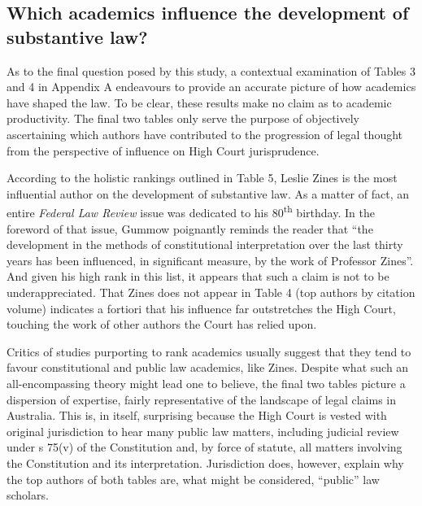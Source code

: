 \subsection{Which academics influence the development of substantive law?}

As to the final question posed by this study, a contextual examination of Tables 3 and 4 in Appendix A endeavours to provide an accurate picture of how academics have shaped the law. To be clear, these results make no claim as to academic productivity. The final two tables only serve the purpose of objectively ascertaining which authors have contributed to the progression of legal thought from the perspective of influence on High Court jurisprudence.

According to the holistic rankings outlined in Table 5, Leslie Zines is the most influential author on the development of substantive law. As a matter of fact, an entire \textit{Federal Law Review} issue was dedicated to his 80\textsuperscript{th} birthday. In the foreword of that issue, Gummow poignantly reminds the reader that ``the development in the methods of constitutional interpretation over the last thirty years has been influenced, in significant measure, by the work of Professor Zines''. And given his high rank in this list, it appears that such a claim is not to be underappreciated. That Zines does not appear in Table 4 (top authors by citation volume) indicates a fortiori that his influence far outstretches the High Court, touching the work of other authors the Court has relied upon.

Critics of studies purporting to rank academics usually suggest that they tend to favour constitutional and public law academics, like Zines. Despite what such an all-encompassing theory might lead one to believe, the final two tables picture a dispersion of expertise, fairly representative of the landscape of legal claims in Australia. This is, in itself, surprising because the High Court is vested with original jurisdiction to hear many public law matters, including judicial review under s 75(v) of the Constitution and, by force of statute, all matters involving the Constitution and its interpretation. Jurisdiction does, however, explain why the top authors of both tables are, what might be considered, ``public'' law scholars.

